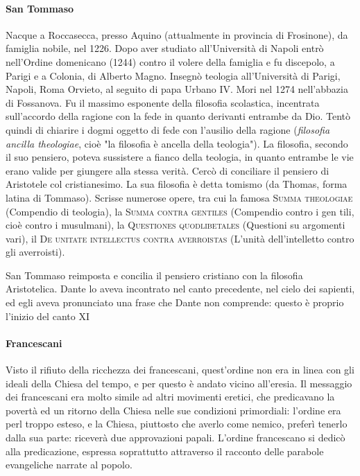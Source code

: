 \documentclass[a4paper, twoside, titlepage]{book}
\newcommand{\straniero}[1]{\textit{#1}} %
\newcommand{\titolo}[1]{\textsc{#1}} %
\begin{document}
\paragraph{San Tommaso} Nacque a Roccasecca, presso Aquino (attualmente in provincia di Frosinone), da famiglia nobile, nel 1226. Dopo aver studiato all'Università di Napoli entrò nell'Ordine domenicano (1244) contro il volere della famiglia e fu discepolo, a Parigi e a Colonia, di Alberto Magno. Insegnò teologia all'Università di Parigi, Napoli, Roma Orvieto, al seguito di papa Urbano IV. Mori nel 1274 nell'abbazia di Fossanova. Fu il massimo esponente della filosofia scolastica, incentrata sull'accordo della ragione con la fede in quanto derivanti entrambe da Dio. Tentò quindi di chiarire i dogmi oggetto di fede con l'ausilio della ragione (\straniero{filosofia ancilla theologiae}, cioè "la filosofia è ancella della teologia"). La filosofia, secondo il suo pensiero, poteva sussistere a fianco della teologia, in quanto entrambe le vie erano valide per giungere alla stessa verità. Cercò di conciliare il pensiero di Aristotele col cristianesimo. La sua filosofia è detta tomismo (da Thomas, forma latina di Tommaso). Scrisse numerose opere, tra cui la famosa \titolo{Summa theologiae} (Compendio di teologia), la \titolo{Summa contra gentiles} (Compendio contro i gen tili, cioè contro i musulmani), la \titolo{Questiones quodlibetales} (Questioni su argomenti vari), il \titolo{De unitate intellectus contra averroistas} (L'unità dell'intelletto contro gli averroisti).

San Tommaso reimposta e concilia il pensiero cristiano con la filosofia Aristotelica. Dante lo aveva incontrato nel canto precedente, nel cielo dei sapienti, ed egli aveva pronunciato una frase che Dante non comprende: questo è proprio l'inizio del canto XI

\paragraph{Francescani} Visto il rifiuto della ricchezza dei francescani, quest'ordine non era in linea con gli ideali della Chiesa del tempo, e per questo è andato vicino all'eresia. Il messaggio dei francescani era molto simile ad altri movimenti eretici, che predicavano la povertà ed un ritorno della Chiesa nelle sue condizioni primordiali: l'ordine era perl troppo esteso, e la Chiesa, piuttosto che averlo come nemico, preferì tenerlo dalla sua parte: riceverà due approvazioni papali. L'ordine francescano si dedicò alla predicazione, espressa soprattutto attraverso il racconto delle parabole evangeliche narrate al popolo.
\end{document}
